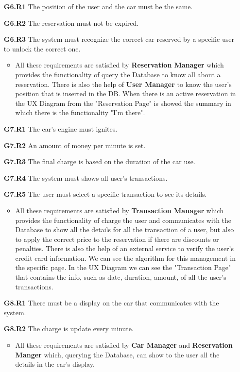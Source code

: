\begin{itemize}
\item[\textbf{G6.R1}] The position of the user and the car must be the same.
\item[\textbf{G6.R2}] The reservation must not be expired.
\item[\textbf{G6.R3}] The system must recognize the correct car reserved by a specific user to unlock the correct one.
\begin{itemize}
\item All these requirements are satisfied by \textbf{Reservation Manager} which provides the functionality of query the Database to know all about a reservation. There is also the help of \textbf{User Manager} to know the user's position that is inserted in the DB. When there is an active reservation in the UX Diagram from the "Reservation Page" is showed the summary in which there is the functionality "I'm there".
\end{itemize}

\item[\textbf{G7.R1}] The car's engine must ignites.
\item[\textbf{G7.R2}] An amount of money per minute is set.
\item[\textbf{G7.R3}] The final charge is based on the duration of the car use.
\item[\textbf{G7.R4}] The system must shows all user's transactions.
\item[\textbf{G7.R5}] The user must select a specific transaction to see its details.
\begin{itemize}
\item All these requirements are satisfied by \textbf{Transaction Manager} which provides the functionality of charge the user and communicates with the Database to show all the details for all the transaction of a user, but also to apply the correct price to the reservation if there are discounts or penalties. There is also the help of an external service to verify the user's credit card information. We can see the algorithm for this management in the specific page. In the UX Diagram we can see the "Transaction Page" that contains the info, such as date, duration, amount, of all the user's transactions.
\end{itemize}

\item[\textbf{G8.R1}] There must be a display on the car that communicates with the system.
\item[\textbf{G8.R2}] The charge is update every minute.
\begin{itemize}
\item All these requirements are satisfied by \textbf{Car Manager} and \textbf{Reservation Manger} which, querying the Database, can show to the user all the details in the car's display.
\end{itemize}


\end{itemize}
